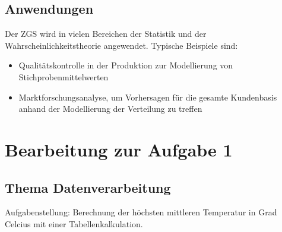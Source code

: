 \documentclass[11pt]{article}
\begin{document}
\subsection{Anwendungen}
Der ZGS wird in vielen Bereichen der Statistik und der Wahrscheinlichkeitstheorie angewendet. Typische Beispiele sind:
\begin{itemize}
    \item Qualitätskontrolle in der Produktion zur Modellierung von Stichprobenmittelwerten
    \item Marktforschungsanalyse, um Vorhersagen für die gesamte Kundenbasis anhand der Modellierung der Verteilung zu treffen
\end{itemize}
\newpage

\section{Bearbeitung zur Aufgabe 1}

\subsection{Thema Datenverarbeitung}
Aufgabenstellung: Berechnung der höchsten mittleren Temperatur in Grad Celcius mit einer Tabellenkalkulation.\par
\end{document}
